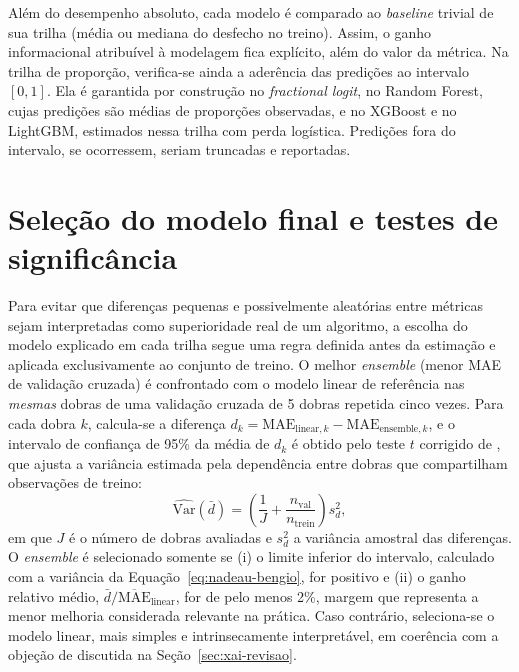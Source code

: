 Além do desempenho absoluto, cada modelo é comparado ao \textit{baseline}
trivial de sua trilha (média ou mediana do desfecho no treino). Assim, o
ganho informacional atribuível à modelagem fica explícito, além do valor da
métrica. Na trilha de proporção, verifica-se ainda a aderência
das predições ao intervalo $[0,1]$. Ela é garantida por construção no
\textit{fractional logit}, no Random Forest, cujas predições são médias de
proporções observadas, e no XGBoost e no LightGBM, estimados nessa trilha
com perda logística. Predições fora do intervalo, se ocorressem, seriam
truncadas e reportadas.

\section{Seleção do modelo final e testes de significância}
\label{sec:testes-significancia}

Para evitar que diferenças pequenas e possivelmente aleatórias entre
métricas sejam interpretadas como superioridade real de um algoritmo, a
escolha do modelo explicado em cada trilha segue uma regra definida antes
da estimação e aplicada exclusivamente ao conjunto de treino. O melhor
\textit{ensemble} (menor MAE de validação cruzada) é confrontado com o
modelo linear de referência nas \emph{mesmas} dobras de uma validação
cruzada de 5 dobras repetida cinco vezes. Para cada dobra $k$, calcula-se
a diferença $d_k = \text{MAE}_{\text{linear},k} - \text{MAE}_{\text{ensemble},k}$,
e o intervalo de confiança de 95\% da média de $d_k$ é obtido pelo teste $t$
corrigido de , que ajusta a variância
estimada pela dependência entre dobras que compartilham observações de
treino:
\begin{equation}
    \widehat{\mathrm{Var}}(\bar{d}) = \left(\frac{1}{J} + \frac{n_{\text{val}}}{n_{\text{trein}}}\right) s^2_d,
    \label{eq:nadeau-bengio}
\end{equation}
em que $J$ é o número de dobras avaliadas e $s^2_d$ a variância amostral das
diferenças. O \textit{ensemble} é selecionado somente se (i) o limite
inferior do intervalo, calculado com a variância da
Equação~\ref{eq:nadeau-bengio}, for positivo e (ii) o ganho relativo médio,
$\bar{d}/\overline{\text{MAE}}_{\text{linear}}$, for de pelo menos 2\%,
margem que representa a menor melhoria considerada relevante na prática.
Caso contrário, seleciona-se o modelo linear, mais simples e
intrinsecamente interpretável, em coerência com a objeção de
 discutida na Seção~\ref{sec:xai-revisao}.

